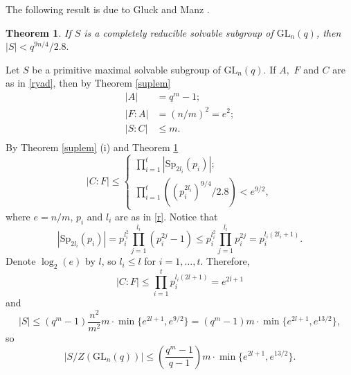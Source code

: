 \documentclass[a4paper,reqno,11pt]{amsart}
\newtheorem{Th}{Theorem}[section]
\theoremstyle{definition}
\theoremstyle{remark}
\numberwithin{equation}{section}
\newcommand{\GL}{{\mathrm{GL}}}
\newcommand{\Sp}{{\mathrm{Sp}}}
\begin{document}
The following result is due to Gluck and Manz {\cite[Theorem 3.5]{manz}}.

\begin{Th}  \label{lowboundsol}
If $S$ is a completely reducible solvable  subgroup of $\GL_n(q)$, then $|S| < q^{9n/4}/2.8.$
\end{Th}


Let $S$ be a primitive maximal solvable  subgroup of $\GL_n(q)$. If $A,$ $F$ and $C$ are as in  \eqref{ryad}, then by Theorem \ref{suplem}
\begin{equation*}
\begin{split}
|A|&=q^m-1;\\
|F:A|&=(n/m)^2=e^2;\\
|S:C|&\le m.\\
\end{split}
\end{equation*}
By  Theorem \ref{suplem} (i) and Theorem \ref{lowboundsol}
\begin{equation}
\label{CFbound}
|C:F| \le 
\begin{cases}
\prod_{i=1}^t |\Sp_{2l_i}(p_i)|;\\
\prod_{i=1}^t ((p_i^{2l_i})^{9/4}/2.8)<e^{9/2},
\end{cases}
\end{equation}
where $e=n/m$, $p_i$ and $l_i$ are as in \eqref{r}. Notice that 
$$|\Sp_{2l_i}(p_i)|=p_i^{l_i^2} \prod_{j=1}^{l_i}(p_i^{2j}-1)\le p_i^{l_i^2} \prod_{j=1}^{l_i}p_i^{2j}=p_i^{l_i(2l_i+1)}. $$
Denote $\log_2(e)$ by $l$, so $l_i \le l$ for $i=1, \ldots, t.$ Therefore,
$$|C:F| \le \prod_{i=1}^t p_i^{l_i(2l+1)}=e^{2l+1} $$ 
and
\begin{equation*}
|S|\le (q^m-1)\frac{n^2}{m^2}m \cdot \min \{ e^{2l+1}, e^{9/2}\}=(q^m-1)m \cdot \min \{e^{2l+1}, e^{13/2}\},
\end{equation*}
so
\begin{equation}\label{H}
|S/Z(\GL_n(q))|\le \left( \frac{q^m-1}{q-1} \right) m\cdot \min \{e^{2l+1}, e^{13/2}\}.
\end{equation}
\end{document}
